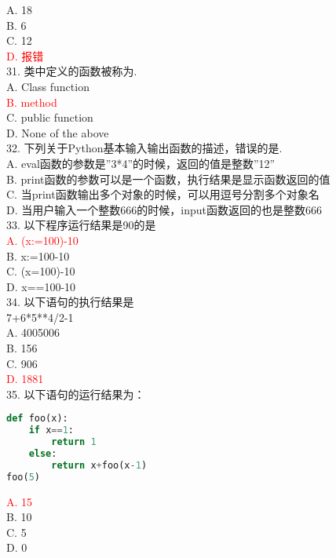 \documentclass[6pt]{article}
\begin{document}
A.	18   \\
B.	6    \\
C.	12     \\
\textcolor{red}{D.	报错}\\

31. 类中定义的函数被称为.\\

A.	Class function\\
\textcolor{red}{B.	method}\\
C.	public function\\
D.	None of the above\\

32. 下列关于Python基本输入输出函数的描述，错误的是.\\

A. eval函数的参数是”3*4”的时候，返回的值是整数”12”\\
B. print函数的参数可以是一个函数，执行结果是显示函数返回的值\\
C. 当print函数输出多个对象的时候，可以用逗号分割多个对象名\\
D. 当用户输入一个整数666的时候，input函数返回的也是整数666\\


33. 以下程序运行结果是90的是\\

\textcolor{red}{A. (x:=100)-10}\\
B. x:=100-10\\
C. (x=100)-10\\
D. x==100-10\\

34. 以下语句的执行结果是\\

7+6*5**4/2-1\\
A. 4005006\\
B. 156\\
C. 906\\
\textcolor{red}{D. 1881}\\

35. 以下语句的运行结果为：\\

\begin{lstlisting}[language=Python]
def foo(x):
	if x==1:
		return 1
	else:
  		return x+foo(x-1)
foo(5)
\end{lstlisting}
\textcolor{red}{A. 15}\\
B. 10\\
C. 5\\
D. 0\\
\end{document}
